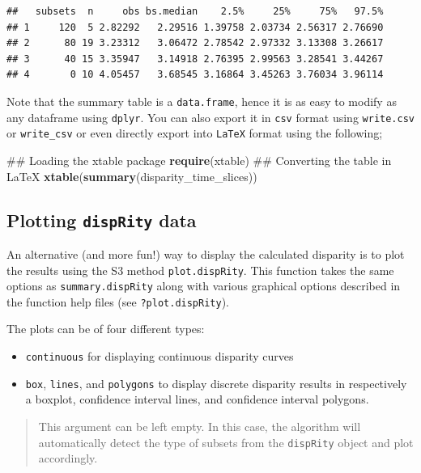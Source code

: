 \documentclass[]{book}
\newenvironment{Shaded}{\begin{snugshade}}{\end{snugshade}}
\newcommand{\KeywordTok}[1]{\textcolor[rgb]{0.13,0.29,0.53}{\textbf{#1}}}
\newcommand{\NormalTok}[1]{#1}
\providecommand{\tightlist}{%
  \setlength{\itemsep}{0pt}\setlength{\parskip}{0pt}}
\theoremstyle{definition}
\theoremstyle{definition}
\theoremstyle{definition}
\theoremstyle{remark}
\begin{document}
\begin{verbatim}
##   subsets  n     obs bs.median    2.5%     25%     75%   97.5%
## 1     120  5 2.82292   2.29516 1.39758 2.03734 2.56317 2.76690
## 2      80 19 3.23312   3.06472 2.78542 2.97332 3.13308 3.26617
## 3      40 15 3.35947   3.14918 2.76395 2.99563 3.28541 3.44267
## 4       0 10 4.05457   3.68545 3.16864 3.45263 3.76034 3.96114
\end{verbatim}

Note that the summary table is a \texttt{data.frame}, hence it is as
easy to modify as any dataframe using \texttt{dplyr}. You can also
export it in \texttt{csv} format using \texttt{write.csv} or
\texttt{write\_csv} or even directly export into \texttt{LaTeX} format
using the following;

\begin{Shaded}
\begin{Highlighting}[]
\NormalTok{## Loading the xtable package}
\KeywordTok{require}\NormalTok{(xtable)}
\NormalTok{## Converting the table in LaTeX}
\KeywordTok{xtable}\NormalTok{(}\KeywordTok{summary}\NormalTok{(disparity_time_slices))}
\end{Highlighting}
\end{Shaded}

\subsection{\texorpdfstring{Plotting \texttt{dispRity}
data}{Plotting dispRity data}}\label{plotting-disprity-data}

An alternative (and more fun!) way to display the calculated disparity
is to plot the results using the S3 method \texttt{plot.dispRity}. This
function takes the same options as \texttt{summary.dispRity} along with
various graphical options described in the function help files (see
\texttt{?plot.dispRity}).

The plots can be of four different types:

\begin{itemize}
\tightlist
\item
  \texttt{continuous} for displaying continuous disparity curves
\item
  \texttt{box}, \texttt{lines}, and \texttt{polygons} to display
  discrete disparity results in respectively a boxplot, confidence
  interval lines, and confidence interval polygons.
\end{itemize}

\begin{quote}
This argument can be left empty. In this case, the algorithm will
automatically detect the type of subsets from the \texttt{dispRity}
object and plot accordingly.
\end{quote}
\end{document}
